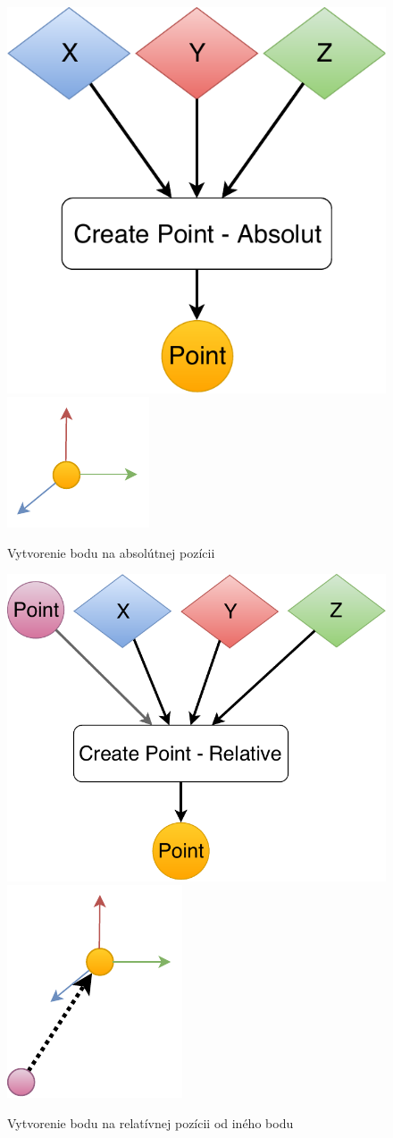 \begin{figure}[H]
	\centering
	\includegraphics[height=0.3\textwidth]{obrazky-figures/Diagram/Point/DP Navrh operacii-0D - Point.pdf}
	\includegraphics[height=0.3\textwidth]{obrazky-figures/Diagram/Draw/1Points/DP Navrh operacii-0D - Point.pdf}
	\caption{Vytvorenie bodu na absolútnej pozícii}
	\label{fig:1}
\end{figure}
\begin{figure}[H]
	\centering
	\includegraphics[height=0.3\textwidth]{obrazky-figures/Diagram/Point/DP Navrh operacii-0D - Point2.pdf}
	\includegraphics[height=0.3\textwidth]{obrazky-figures/Diagram/Draw/1Points/DP Navrh operacii-0D - PointRelative.pdf}
	\caption{Vytvorenie bodu na relatívnej pozícii od iného bodu}
	\label{fig:1}
\end{figure}

